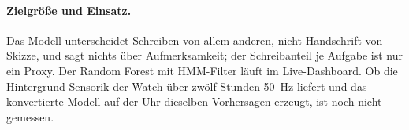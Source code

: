 \paragraph{Zielgröße und Einsatz.} Das Modell unterscheidet Schreiben von
allem anderen, nicht Handschrift von Skizze, und sagt nichts über
Aufmerksamkeit; der Schreibanteil je Aufgabe ist nur ein Proxy. Der Random
Forest mit HMM-Filter läuft im Live-Dashboard. Ob die Hintergrund-Sensorik
der Watch über zwölf Stunden 50~Hz liefert und das konvertierte Modell auf
der Uhr dieselben Vorhersagen erzeugt, ist noch nicht gemessen.

